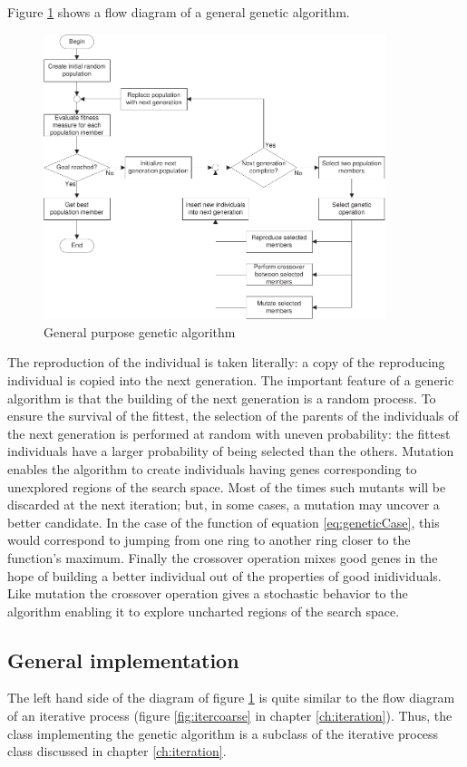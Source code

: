 Figure \ref{fig:geneticFlow} shows a flow diagram of a general
genetic algorithm.
\begin{figure}
\centering\includegraphics[width=10cm]{Figures/GeneticFlow}
\caption{General purpose genetic algorithm}\label{fig:geneticFlow}
\end{figure}
The reproduction of the individual is taken literally: a copy of
the reproducing individual is copied into the next generation. The
important feature of a generic algorithm is that the building of
the next generation is a random process. To ensure the survival of
the fittest, the selection of the parents of the individuals of
the next generation is performed at random with uneven
probability: the fittest individuals have a larger probability of
being selected than the others. Mutation enables the algorithm to
create individuals having genes corresponding to unexplored
regions of the search space. Most of the times such mutants will
be discarded at the next iteration; but, in some cases, a mutation
may uncover a better candidate. In the case of the function of
equation \ref{eq:geneticCase}, this would correspond to jumping
from one ring to another ring closer to the function's maximum.
Finally the crossover operation mixes good genes in the hope of
building a better individual out of the properties of good
inidividuals. Like mutation the crossover operation gives a
stochastic behavior to the algorithm enabling it to explore
uncharted regions of the search space.


\subsection{General implementation}
\label{sec:gengenetic} The left hand side of the diagram of figure
\ref{fig:geneticFlow} is quite similar to the flow diagram of an
iterative process (\cf figure \ref{fig:itercoarse} in chapter
\ref{ch:iteration}). Thus, the class implementing the genetic
algorithm is a subclass of the iterative process class discussed
in chapter \ref{ch:iteration}.

